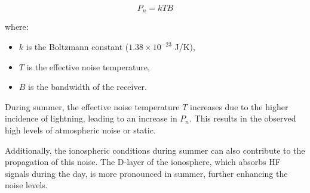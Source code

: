 \[ P_n = kTB \]

where:
\begin{itemize}
    \item \( k \) is the Boltzmann constant (\( 1.38 \times 10^{-23} \) J/K),
    \item \( T \) is the effective noise temperature,
    \item \( B \) is the bandwidth of the receiver.
\end{itemize}

During summer, the effective noise temperature \( T \) increases due to the higher incidence of lightning, leading to an increase in \( P_n \). This results in the observed high levels of atmospheric noise or static.

Additionally, the ionospheric conditions during summer can also contribute to the propagation of this noise. The D-layer of the ionosphere, which absorbs HF signals during the day, is more pronounced in summer, further enhancing the noise levels.

